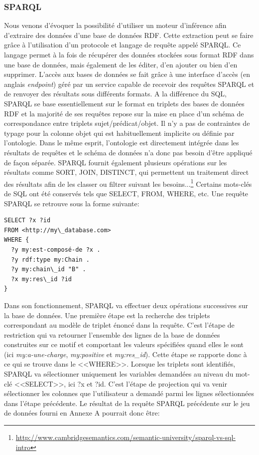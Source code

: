 \subsubsection{SPARQL} \label{sparql}

Nous venons d'évoquer la possibilité d'utiliser un moteur d'inférence afin d'extraire des données d'une base de données RDF. Cette extraction peut se faire grâce à l'utilisation d'un protocole et langage de requête appelé SPARQL. Ce langage permet à la fois de récupérer des données stockées sous format RDF dans une base de données, mais également de les éditer, d'en ajouter ou bien d'en supprimer. L'accès aux bases de données se fait grâce à une interface d'accès (en anglais \textit{endpoint}) géré par un service capable de recevoir des requêtes SPARQL et de renvoyer des résultats sous différents formats.
A la différence du SQL, SPARQL se base essentiellement sur le format en triplets des bases de données RDF et la majorité de ses requêtes repose sur la mise en place d'un schéma de correspondance entre triplets sujet/prédicat/objet. Il n'y a pas de contraintes de typage pour la colonne objet qui est habituellement implicite ou définie par l'ontologie. Dans le même esprit, l'ontologie est directement intégrée dans les résultats de requêtes et le schéma de données n'a donc pas besoin d'être appliqué de façon séparée. SPARQL fournit également plusieurs opérations sur les résultats comme SORT, JOIN, DISTINCT, qui permettent un traitement direct des résultats afin de les classer ou filtrer suivant les besoins...\footnote{\url{http://www.cambridgesemantics.com/semantic-university/sparql-vs-sql-intro}} Certains mots-clés de SQL ont été conservés tels que SELECT, FROM, WHERE, etc.
Une requête SPARQL se retrouve sous la forme suivante:

\begin{lstlisting}[language=SPARQL]
SELECT ?x ?id
FROM <http://my\_database.com> 
WHERE {
  ?y my:est-composé-de ?x .
  ?y rdf:type my:Chain .
  ?y my:chain\_id "B" .
  ?x my:res\_id ?id
}
\end{lstlisting}

Dans son fonctionnement, SPARQL va effectuer deux opérations successives sur la base de données. Une première étape est la recherche des triplets correspondant au modèle de triplet énoncé dans la requête. C'est l'étape de restriction qui va retourner l'ensemble des lignes de la base de données construites sur ce motif et comportant les valeurs spécifiées quand elles le sont (ici \textit{my:a-une-charge}, \textit{my:positive} et \textit{my:res\_id}). Cette étape se rapporte donc à ce qui se trouve dans le <<WHERE>>. Lorsque les triplets sont identifiés, SPARQL va sélectionner uniquement les variables demandées au niveau du mot-clé <<SELECT>>, ici ?x et ?id. C'est l'étape de projection qui va venir sélectionner les colonnes que l'utilisateur a demandé parmi les lignes sélectionnées dans l'étape précédente. Le résultat de la requête SPARQL précédente sur le jeu de données fourni en Annexe A pourrait donc être:

